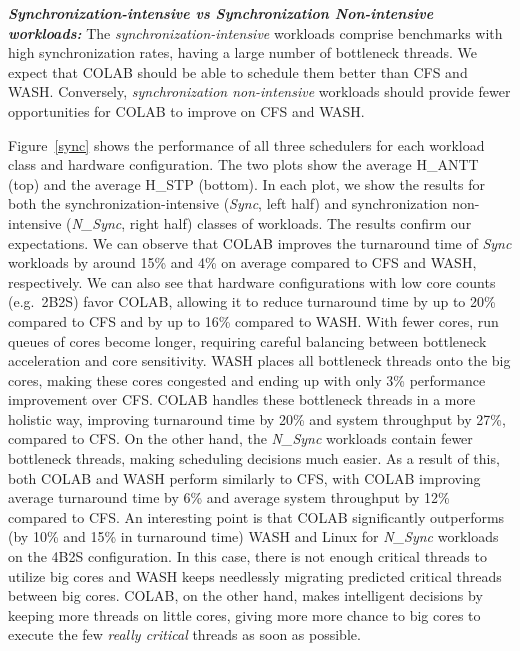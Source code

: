 \textbf{\textit{Synchronization-intensive vs Synchronization Non-intensive workloads:}}
The \emph{synchronization-intensive} workloads comprise benchmarks with high synchronization rates, having a large number of bottleneck threads. We expect that COLAB should be able to schedule them better than CFS and WASH. Conversely, \emph{synchronization non-intensive} workloads should provide fewer opportunities for COLAB to improve on CFS and WASH.

Figure~\ref{sync} shows the performance of all three schedulers for each workload class and hardware configuration. The two plots show the 
average H\_ANTT (top) and the average H\_STP (bottom). In each plot, we show the results for both the synchronization-intensive (\emph{Sync}, left half) and synchronization non-intensive (\emph{N\_Sync}, right half) classes of workloads.
The results confirm our expectations. We can observe that COLAB improves the turnaround time of \emph{Sync} workloads by around 15\% and 4\% on average compared to CFS and WASH, respectively. We can also see that hardware configurations with low core counts (e.g.~2B2S) favor COLAB, allowing it to reduce turnaround time by up to 20\% compared to CFS and by up to 16\% compared to WASH. With fewer cores, run queues of cores become longer, requiring careful balancing between bottleneck acceleration and core sensitivity. WASH places all bottleneck threads onto the big cores, making these cores congested and ending up with only 3\% performance improvement over CFS. COLAB handles these bottleneck threads in a more holistic way, improving turnaround time by 20\% and system throughput by 27\%, compared to CFS.
%
On the other hand, the \emph{N\_Sync} workloads contain fewer bottleneck threads, making scheduling decisions much easier. As a result of this, both COLAB and WASH perform similarly to CFS, with COLAB improving average turnaround time by 6\% and average system throughput by 12\% compared to CFS.
An interesting point is that COLAB significantly outperforms (by 10\% and 15\% in turnaround time) WASH and Linux for \emph{N\_Sync} workloads on the 4B2S configuration. In this case, there is not enough critical threads to utilize big cores and WASH keeps needlessly migrating predicted critical threads between big cores. COLAB, on the other hand, makes intelligent decisions by keeping more threads on little cores, giving more more chance to big cores to execute the few \emph{really critical} threads as soon as possible.

